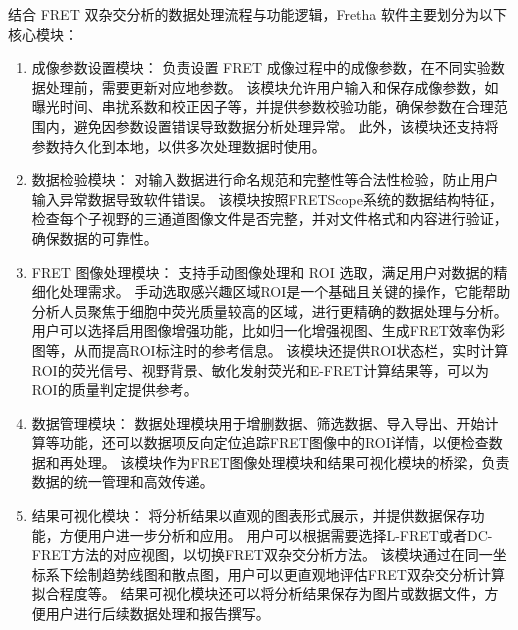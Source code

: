 结合 FRET 双杂交分析的数据处理流程与功能逻辑，Fretha 软件主要划分为以下核心模块：
\begin{enumerate}
  \item {成像参数设置模块：}
  负责设置 FRET 成像过程中的成像参数，在不同实验数据处理前，需要更新对应地参数。
  该模块允许用户输入和保存成像参数，如曝光时间、串扰系数和校正因子等，并提供参数校验功能，确保参数在合理范围内，避免因参数设置错误导致数据分析处理异常。
  此外，该模块还支持将参数持久化到本地，以供多次处理数据时使用。
  \item {数据检验模块：}
  对输入数据进行命名规范和完整性等合法性检验，防止用户输入异常数据导致软件错误。
  该模块按照FRETScope系统的数据结构特征，检查每个子视野的三通道图像文件是否完整，并对文件格式和内容进行验证，确保数据的可靠性。
  \item {FRET 图像处理模块：}
  支持手动图像处理和 ROI 选取，满足用户对数据的精细化处理需求。
  手动选取感兴趣区域ROI是一个基础且关键的操作，它能帮助分析人员聚焦于细胞中荧光质量较高的区域，进行更精确的数据处理与分析。
  用户可以选择启用图像增强功能，比如归一化增强视图、生成FRET效率伪彩图等，从而提高ROI标注时的参考信息。
  该模块还提供ROI状态栏，实时计算ROI的荧光信号、视野背景、敏化发射荧光和E-FRET计算结果等，可以为ROI的质量判定提供参考。
  \item {数据管理模块：}
  数据处理模块用于增删数据、筛选数据、导入导出、开始计算等功能，还可以数据项反向定位追踪FRET图像中的ROI详情，以便检查数据和再处理。
  该模块作为FRET图像处理模块和结果可视化模块的桥梁，负责数据的统一管理和高效传递。
  \item {结果可视化模块：}
  将分析结果以直观的图表形式展示，并提供数据保存功能，方便用户进一步分析和应用。
  用户可以根据需要选择L-FRET或者DC-FRET方法的对应视图，以切换FRET双杂交分析方法。
  该模块通过在同一坐标系下绘制趋势线图和散点图，用户可以更直观地评估FRET双杂交分析计算拟合程度等。
  结果可视化模块还可以将分析结果保存为图片或数据文件，方便用户进行后续数据处理和报告撰写。
  
\end{enumerate}

